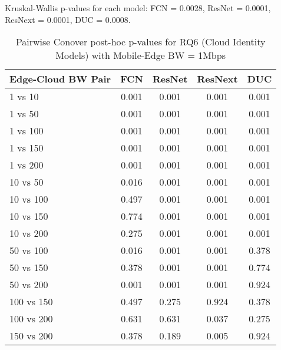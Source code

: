 \begin{table}[h]
\centering
\caption{Pairwise Conover post-hoc p-values for RQ6 (Cloud Identity Models) with Mobile-Edge BW = 1Mbps}
\label{tab:conover_cloud_identity_me1}
\smallskip
Kruskal-Wallis p-values for each model: FCN = 0.0028, ResNet = 0.0001, ResNext = 0.0001, DUC = 0.0008.

\begin{tabular}{lcccc}
\toprule
Edge-Cloud BW Pair & FCN & ResNet & ResNext & DUC \\
\midrule
1 vs 10 & 0.001 & 0.001 & 0.001 & 0.001 \\
1 vs 50 & 0.001 & 0.001 & 0.001 & 0.001 \\
1 vs 100 & 0.001 & 0.001 & 0.001 & 0.001 \\
1 vs 150 & 0.001 & 0.001 & 0.001 & 0.001 \\
1 vs 200 & 0.001 & 0.001 & 0.001 & 0.001 \\
10 vs 50 & 0.016 & 0.001 & 0.001 & 0.001 \\
10 vs 100 & 0.497 & 0.001 & 0.001 & 0.001 \\
10 vs 150 & 0.774 & 0.001 & 0.001 & 0.001 \\
10 vs 200 & 0.275 & 0.001 & 0.001 & 0.001 \\
50 vs 100 & 0.016 & 0.001 & 0.001 & 0.378 \\
50 vs 150 & 0.378 & 0.001 & 0.001 & 0.774 \\
50 vs 200 & 0.001 & 0.001 & 0.001 & 0.924 \\
100 vs 150 & 0.497 & 0.275 & 0.924 & 0.378 \\
100 vs 200 & 0.631 & 0.631 & 0.037 & 0.275 \\
150 vs 200 & 0.378 & 0.189 & 0.005 & 0.924 \\
\bottomrule
\end{tabular}
\end{table}

